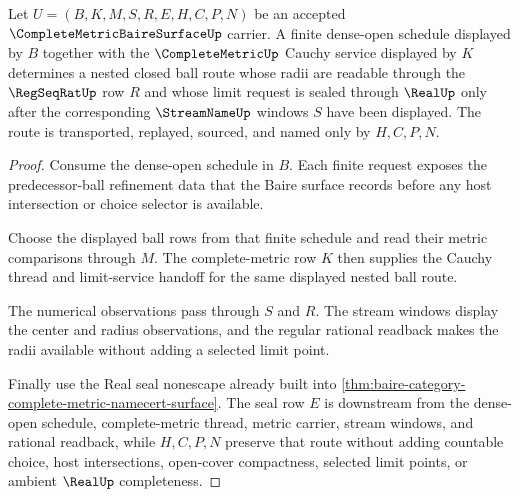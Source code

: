 \begin{theorem}
\label{thm:complete-metric-baire-surface-nested-ball-route}
Let $U=(B,K,M,S,R,E,H,C,P,N)$ be an accepted $\CompleteMetricBaireSurfaceUp$ carrier. A finite dense-open schedule displayed by $B$ together with the $\CompleteMetricUp$ Cauchy service displayed by $K$ determines a nested closed ball route whose radii are readable through the $\RegSeqRatUp$ row $R$ and whose limit request is sealed through $\RealUp$ only after the corresponding $\StreamNameUp$ windows $S$ have been displayed. The route is transported, replayed, sourced, and named only by $H,C,P,N$.
\end{theorem}
\begin{proof}
Consume the dense-open schedule in $B$. Each finite request exposes the predecessor-ball refinement data that the Baire surface records before any host intersection or choice selector is available.

Choose the displayed ball rows from that finite schedule and read their metric comparisons through $M$. The complete-metric row $K$ then supplies the Cauchy thread and limit-service handoff for the same displayed nested ball route.

The numerical observations pass through $S$ and $R$. The stream windows display the center and radius observations, and the regular rational readback makes the radii available without adding a selected limit point.

Finally use the Real seal nonescape already built into \autoref{thm:baire-category-complete-metric-namecert-surface}. The seal row $E$ is downstream from the dense-open schedule, complete-metric thread, metric carrier, stream windows, and rational readback, while $H,C,P,N$ preserve that route without adding countable choice, host intersections, open-cover compactness, selected limit points, or ambient $\RealUp$ completeness.
\end{proof}


